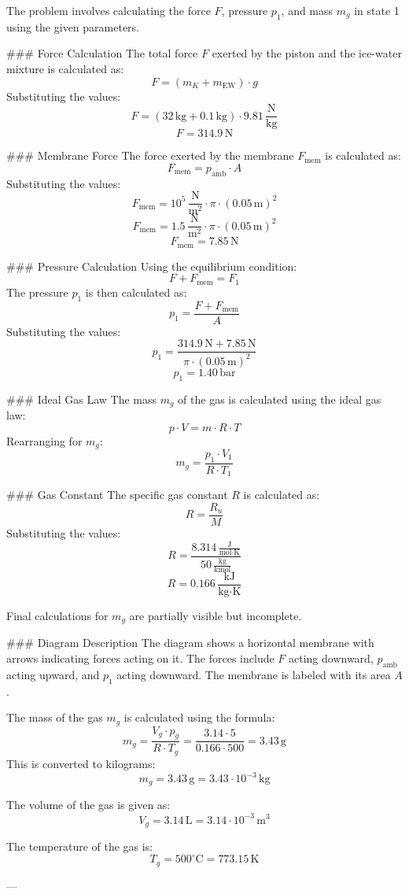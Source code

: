 The problem involves calculating the force \( F \), pressure \( p_1 \), and mass \( m_g \) in state 1 using the given parameters.  

### Force Calculation  
The total force \( F \) exerted by the piston and the ice-water mixture is calculated as:  
\[
F = (m_K + m_{\text{EW}}) \cdot g
\]  
Substituting the values:  
\[
F = (32 \, \text{kg} + 0.1 \, \text{kg}) \cdot 9.81 \, \frac{\text{N}}{\text{kg}}
\]  
\[
F = 314.9 \, \text{N}
\]  

### Membrane Force  
The force exerted by the membrane \( F_{\text{mem}} \) is calculated as:  
\[
F_{\text{mem}} = p_{\text{amb}} \cdot A
\]  
Substituting the values:  
\[
F_{\text{mem}} = 10^5 \, \frac{\text{N}}{\text{m}^2} \cdot \pi \cdot (0.05 \, \text{m})^2
\]  
\[
F_{\text{mem}} = 1.5 \, \frac{\text{N}}{\text{m}^2} \cdot \pi \cdot (0.05 \, \text{m})^2
\]  
\[
F_{\text{mem}} = 7.85 \, \text{N}
\]  

### Pressure Calculation  
Using the equilibrium condition:  
\[
F + F_{\text{mem}} = F_1
\]  
The pressure \( p_1 \) is then calculated as:  
\[
p_1 = \frac{F + F_{\text{mem}}}{A}
\]  
Substituting the values:  
\[
p_1 = \frac{314.9 \, \text{N} + 7.85 \, \text{N}}{\pi \cdot (0.05 \, \text{m})^2}
\]  
\[
p_1 = 1.40 \, \text{bar}
\]  

### Ideal Gas Law  
The mass \( m_g \) of the gas is calculated using the ideal gas law:  
\[
p \cdot V = m \cdot R \cdot T
\]  
Rearranging for \( m_g \):  
\[
m_g = \frac{p_1 \cdot V_1}{R \cdot T_1}
\]  

### Gas Constant  
The specific gas constant \( R \) is calculated as:  
\[
R = \frac{R_u}{M}
\]  
Substituting the values:  
\[
R = \frac{8.314 \, \frac{\text{J}}{\text{mol} \cdot \text{K}}}{50 \, \frac{\text{kg}}{\text{kmol}}}
\]  
\[
R = 0.166 \, \frac{\text{kJ}}{\text{kg} \cdot \text{K}}
\]  

Final calculations for \( m_g \) are partially visible but incomplete.  

### Diagram Description  
The diagram shows a horizontal membrane with arrows indicating forces acting on it. The forces include \( F \) acting downward, \( p_{\text{amb}} \) acting upward, and \( p_1 \) acting downward. The membrane is labeled with its area \( A \).

The mass of the gas \( m_g \) is calculated using the formula:  
\[
m_g = \frac{V_g \cdot p_g}{R \cdot T_g} = \frac{3.14 \cdot 5}{0.166 \cdot 500} = 3.43 \, \text{g}
\]  
This is converted to kilograms:  
\[
m_g = 3.43 \, \text{g} = 3.43 \cdot 10^{-3} \, \text{kg}
\]  

The volume of the gas is given as:  
\[
V_g = 3.14 \, \text{L} = 3.14 \cdot 10^{-3} \, \text{m}^3
\]  

The temperature of the gas is:  
\[
T_g = 500^\circ\text{C} = 773.15 \, \text{K}
\]  

---